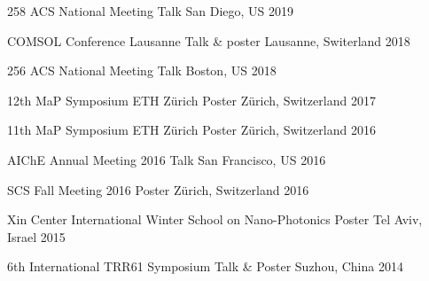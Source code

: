 
\begin{cvtalks}

   \cvtalk
  {258 ACS National Meeting}
  {Talk}
  {San Diego, US}
  {2019}
  
  \cvtalk
  {COMSOL Conference Lausanne}
  {Talk \& poster}
  {Lausanne, Switerland}
  {2018}

  \cvtalk
  {256 ACS National Meeting}
  {Talk}
  {Boston, US}
  {2018}

  \cvtalk
  {12th MaP Symposium ETH Z\"{u}rich}
  {Poster}
  {Z\"{u}rich, Switzerland}
  {2017}

  \cvtalk
  {11th MaP Symposium ETH Z\"{u}rich}
  {Poster}
  {Z\"{u}rich, Switzerland}
  {2016}

  \cvtalk
  {AIChE Annual Meeting 2016}
  {Talk}
  {San Francisco, US}
  {2016}

  \cvtalk
  {SCS Fall Meeting 2016}
  {Poster}
  {Z\"{u}rich, Switzerland}
  {2016}

  \cvtalk
  {Xin Center International Winter School on Nano-Photonics}
  {Poster}
  {Tel Aviv, Israel}
  {2015}

  \cvtalk
  {6th International TRR61 Symposium}
  {Talk \& Poster}
  {Suzhou, China}
  {2014}

\end{cvtalks}
